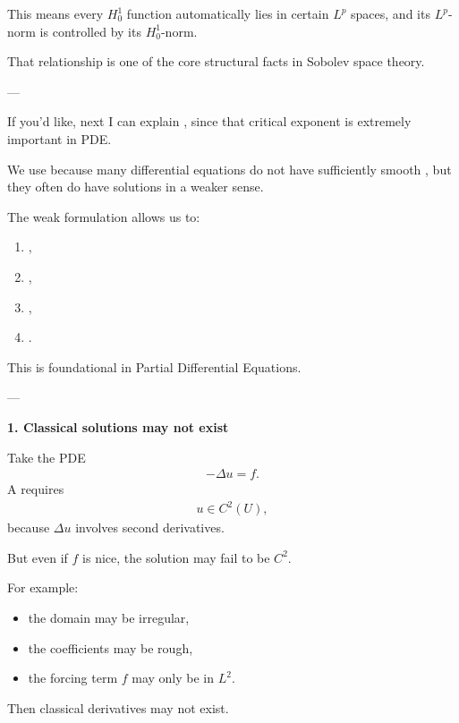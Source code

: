 \documentclass[12pt,a4paper]{report}
\begin{document}
\begin{description}
\begin{description}
This means every $H_0^1$ function automatically lies in certain $L^p$ spaces, and its $L^p$-norm is controlled by its $H_0^1$-norm.

That relationship is one of the core structural facts in Sobolev space theory.

---
\end{description}

If you'd like, next I can explain , since that critical exponent is extremely important in PDE.


\newpage

	\item {}

We use  because many differential equations do not have sufficiently smooth , but they often do have solutions in a weaker sense.

The weak formulation allows us to:
\begin{enumerate}
\item {},
\item {},
\item {},
\item {}.
\end{enumerate}
This is foundational in Partial Differential Equations.

---
\begin{description}

\item \textbf{1. Classical solutions may not exist}

Take the PDE
\begin{align*}
-\Delta u=f.
\end{align*}
A  requires
\begin{align*}
u\in C^2(U),
\end{align*}
because $\Delta u$ involves second derivatives.

But even if $f$ is nice, the solution may fail to be $C^2$.

For example:
\begin{itemize}
\item the domain may be irregular,
\item the coefficients may be rough,
\item the forcing term $f$ may only be in $L^2$.
\end{itemize}
Then classical derivatives may not exist.


\end{description}
\end{description}
\end{document}
